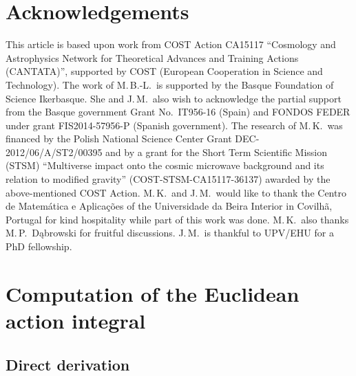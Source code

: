 \documentclass[aps,nofootinbib,prd,superscriptaddress,eqsecnum,showpacs,showkeys,preprintnumbers,altaffilletter]{revtex4}
\begin{document}
\section*{Acknowledgements}
This article is based upon work from COST Action CA15117 ``Cosmology and Astrophysics Network for Theoretical Advances and Training Actions (CANTATA)'', supported by COST (European Cooperation in Science and Technology). The work of M.\,B.-L.~is supported by the Basque Foundation of Science Ikerbasque. She and J.\,M.~also wish to acknowledge the partial support from the Basque government Grant No.~IT956-16 (Spain) and FONDOS FEDER under grant FIS2014-57956-P (Spanish government). The research of M.\,K.~was financed by the Polish National Science Center Grant DEC-2012/06/A/ST2/00395 and by a grant for the Short Term Scientific Mission (STSM) ``Multiverse impact onto the cosmic microwave background and its relation to modified gravity'' (COST-STSM-CA15117-36137) awarded by the above-mentioned COST Action. M.\,K.~and J.\,M.~would like to thank the Centro de Matem\'atica e Aplica\c{c}\~{o}es of the Universidade da Beira Interior in Covilh\~{a}, Portugal for kind hospitality while part of this work was done. M.\,K.~also thanks M.\,P.~D\k{a}browski for fruitful discussions. J.\,M.~is thankful to UPV/EHU for a PhD fellowship.

%
%

\appendix

\section{Computation of the Euclidean action integral}

%
%

\subsection{Direct derivation}
\label{App_A}
\end{document}
